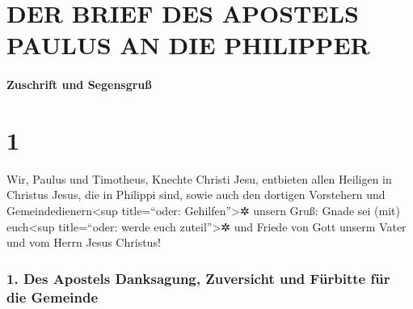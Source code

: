 \hypertarget{der-brief-des-apostels-paulus-an-die-philipper}{%
\section{DER BRIEF DES APOSTELS PAULUS AN DIE
PHILIPPER}\label{der-brief-des-apostels-paulus-an-die-philipper}}

\hypertarget{zuschrift-und-segensgruuxdf}{%
\paragraph{Zuschrift und Segensgruß}\label{zuschrift-und-segensgruuxdf}}

\hypertarget{section}{%
\section{1}\label{section}}

 Wir, Paulus und Timotheus, Knechte Christi Jesu,
entbieten allen Heiligen in Christus Jesus, die in Philippi sind, sowie
auch den dortigen Vorstehern und Gemeindedienern\textless sup
title=``oder: Gehilfen''\textgreater✲ unsern Gruß:  Gnade
sei (mit) euch\textless sup title=``oder: werde euch
zuteil''\textgreater✲ und Friede von Gott unserm Vater und vom Herrn
Jesus Christus!

\hypertarget{des-apostels-danksagung-zuversicht-und-fuxfcrbitte-fuxfcr-die-gemeinde}{%
\subsubsection{1. Des Apostels Danksagung, Zuversicht und Fürbitte für
die
Gemeinde}\label{des-apostels-danksagung-zuversicht-und-fuxfcrbitte-fuxfcr-die-gemeinde}}

